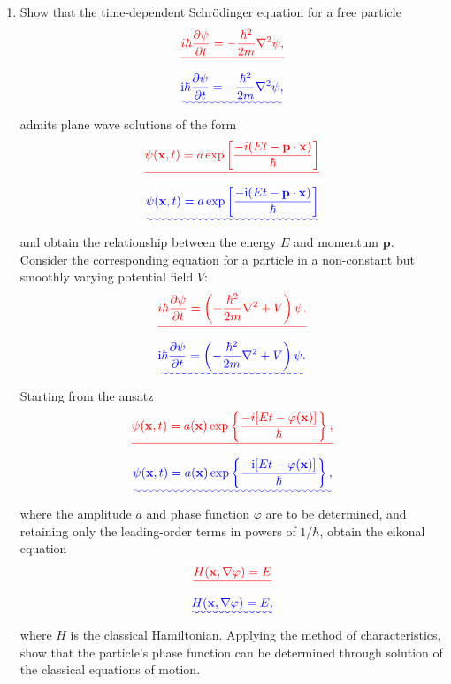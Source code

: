 \documentclass[a4paper,10pt]{paper}
\providecommand{\DIFadd}[1]{{\protect\color{blue}\uwave{#1}}} %
\providecommand{\DIFdel}[1]{{\protect\color{red}\sout{#1}}}                      %
\providecommand{\DIFaddbegin}{} %
\providecommand{\DIFaddend}{} %
\providecommand{\DIFdelbegin}{} %
\providecommand{\DIFdelend}{} %
\begin{document}
\begin{enumerate}
\item Show that the time-dependent Schrödinger equation for a free particle
\DIFdelbegin \begin{displaymath}
    \DIFdel{i\hbar\frac{\partial\psi}{\partial t}=-\frac{\hbar^{2}}{2m}\nabla^{2}\psi,
}\end{displaymath}%
\DIFdelend \DIFaddbegin \begin{equation*}
    \DIFadd{\ii\hbar\frac{\partial\psi}{\partial t}=-\frac{\hbar^{2}}{2m}\nabla^{2}\psi,
}\end{equation*}\DIFaddend 
admits plane wave solutions of the form
\DIFdelbegin \begin{displaymath}
    \DIFdel{\psi(\mathbf{x},t)=a\exp\left[\frac{-i(E t-\mathbf{p}\cdot\mathbf{x})}{\hbar}\right]
}\end{displaymath}%
\DIFdelend \DIFaddbegin \begin{equation*}
    \DIFadd{\psi(\mathbf{x},t)=a\exp\left[\frac{-\ii(E t-\mathbf{p}\cdot\mathbf{x})}{\hbar}\right]
}\end{equation*}\DIFaddend 
and obtain the relationship between the energy $E$ and momentum $\mathbf{p}$. Consider the corresponding equation for a particle in a non-constant but smoothly varying potential field $V$:
\DIFdelbegin \begin{displaymath}
    \DIFdel{i\hbar\frac{\partial\psi}{\partial t}=\left(-\frac{\hbar^{2}}{2m}\nabla^{2}+V\right)\psi.
}\end{displaymath}%
\DIFdelend \DIFaddbegin \begin{equation*}
    \DIFadd{\ii\hbar\frac{\partial\psi}{\partial t}=\left(-\frac{\hbar^{2}}{2m}\nabla^{2}+V\right)\psi.
}\end{equation*}\DIFaddend 
Starting from the ansatz
\DIFdelbegin \begin{displaymath}
    \DIFdel{\psi(\mathbf{x},t)=a(\mathbf{x})\exp\left\{\frac{-i[E t-\varphi(\mathbf{x})]}{\hbar}\right\},
}\end{displaymath}%
\DIFdelend \DIFaddbegin \begin{equation*}
    \DIFadd{\psi(\mathbf{x},t)=a(\mathbf{x})\exp\left\{\frac{-\ii[E t-\varphi(\mathbf{x})]}{\hbar}\right\},
}\end{equation*}\DIFaddend 
where the amplitude $a$ and phase function $\varphi$ are to be determined, and retaining only the leading-order terms in powers of $1/\hbar$, obtain the eikonal equation
\DIFdelbegin \begin{displaymath}
    \DIFdel{H(\mathbf{x},\nabla\varphi)=E
}\end{displaymath}%
\DIFdelend \DIFaddbegin \begin{equation*}
    \DIFadd{H(\mathbf{x},\nabla\varphi)=E,
}\end{equation*}\DIFaddend 
where $H$ is the classical Hamiltonian. Applying the method of characteristics, show that the particle's phase function can be determined through solution of the classical equations of motion.


\end{enumerate}
\end{document}
